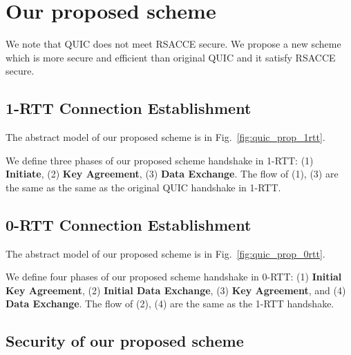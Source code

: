 \section{Our proposed scheme} \label{sec:proposed_scheme}

We note that QUIC does not meet RSACCE secure.
We propose a new scheme which is more secure and efficient
than original QUIC and it satisfy RSACCE secure.


\subsection{1-RTT Connection Establishment} \label{sec:quic_prop_1rtt}

The abstract model of our proposed scheme is in
Fig.~\ref{fig:quic_prop_1rtt}.



We define three phases of our proposed scheme handshake in 1-RTT:
(1) \textbf{Initiate},
(2) \textbf{Key Agreement},
(3) \textbf{Data Exchange}.
The flow of (1), (3) are the same as the same as the original QUIC
handshake in 1-RTT.



\subsection{0-RTT Connection Establishment} \label{sec:quic_prop_0rtt}

The abstract model of our proposed scheme is in
Fig.~\ref{fig:quic_prop_0rtt}.



We define four phases of our proposed scheme handshake in 0-RTT:
(1) \textbf{Initial Key Agreement},
(2) \textbf{Initial Data Exchange},
(3) \textbf{Key Agreement}, and
(4) \textbf{Data Exchange}.
The flow of (2), (4) are the same as the 1-RTT
handshake.




\subsection{Security of our proposed scheme} \label{sec:quic_proof}



